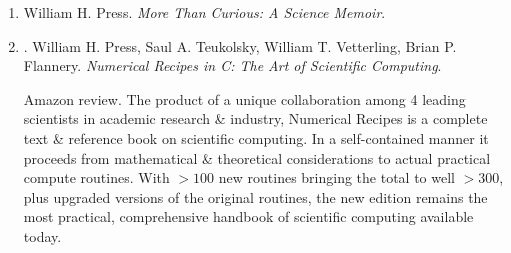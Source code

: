 \documentclass{article}
\begin{document}
\begin{enumerate}
	{\sc Saul A. Teukolsky} is H. A. Bethe Professor in Physics in the Radiophysics \& Space Research Department of Cornell University.
	
	{\sc William Vetterling} is a Research Fellow \& Director of the Image Science Laboratory at ZINK Imaging, LLC in Waltham, MA. His career includes eight years on the physics faculty at Harvard \& 20 years of numerical modeling \& laboratory research on digital imaging at Polaroid Corporation.
	
	{\sc Brian P. Flannery} is Science, Strategy \& Programs Manager at Exxon Mobil Corporation.
	
	\item {\sc William H. Press}. {\it More Than Curious: A Science Memoir}.
	
	\item \cite{Press_Teukolsky_Vetterling_Flannery_recipe_C}. {\sc William H. Press, Saul A. Teukolsky, William T. Vetterling, Brian P. Flannery}. {\it Numerical Recipes in C: The Art of Scientific Computing}. {}
	
	{\sf Amazon review.} The product of a unique collaboration among 4 leading scientists in academic research \& industry, Numerical Recipes is a complete text \& reference book on scientific computing. In a self-contained manner it proceeds from mathematical \& theoretical considerations to actual practical compute routines. With $> 100$ new routines bringing the total to well $> 300$, plus upgraded versions of the original routines, the new edition remains the most practical, comprehensive handbook of scientific computing available today.
	

\end{enumerate}
\end{document}
